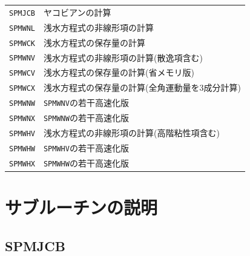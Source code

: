 \vspace{1em}
\begin{tabular}{ll}
{\tt SPMJCB} & ヤコビアンの計算\\
{\tt SPMWNL} & 浅水方程式の非線形項の計算\\
{\tt SPMWCK} & 浅水方程式の保存量の計算\\
{\tt SPMWNV} & 浅水方程式の非線形項の計算(散逸項含む)\\
{\tt SPMWCV} & 浅水方程式の保存量の計算(省メモリ版)\\
{\tt SPMWCX} & 浅水方程式の保存量の計算(全角運動量を3成分計算)\\
{\tt SPMWNW} & {\tt SPMWNV}の若干高速化版\\
{\tt SPMWNX} & {\tt SPMWNW}の若干高速化版\\
{\tt SPMWHV} & 浅水方程式の非線形項の計算(高階粘性項含む)\\
{\tt SPMWHW} & {\tt SPMWHV}の若干高速化版\\
{\tt SPMWHX} & {\tt SPMWHW}の若干高速化版\\
\end{tabular}


\section{サブルーチンの説明}

\subsection{SPMJCB}


